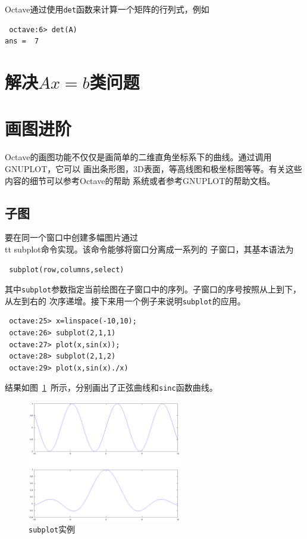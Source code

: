 \documentclass[UTF8,adobefonts]{ctexart}
\begin{document}
Octave通过使用{\tt det}函数来计算一个矩阵的行列式，例如
\begin{verbatim}
 octave:6> det(A)
ans =  7
\end{verbatim}
\section{解决$Ax=b$类问题}

\section{画图进阶}
Octave的画图功能不仅仅是画简单的二维直角坐标系下的曲线。通过调用GNUPLOT，它可以
画出条形图，3D表面，等高线图和极坐标图等等。有关这些内容的细节可以参考Octave的帮助
系统或者参考GNUPLOT的帮助文档。
\subsection{子图}
要在同一个窗口中创建多幅图片通过{\\tt subplot}命令实现。该命令能够将窗口分离成一系列的
子窗口，其基本语法为
\begin{verbatim}
 subplot(row,columns,select)
\end{verbatim}
其中{\tt subplot}参数指定当前绘图在子窗口中的序列。子窗口的序号按照从上到下，从左到右的
次序递增。接下来用一个例子来说明{\tt subplot}的应用。
\begin{verbatim}
 octave:25> x=linspace(-10,10);
 octave:26> subplot(2,1,1)
 octave:27> plot(x,sin(x));
 octave:28> subplot(2,1,2)
 octave:29> plot(x,sin(x)./x)
\end{verbatim}
结果如图~\ref{sinandsinc}~所示，分别画出了正弦曲线和{\tt sinc}函数曲线。
\begin{figure}
 \centering
 \includegraphics[width=0.6\textwidth]{sinandsinc.eps}
 \caption{{\tt subplot}实例}
 \label{sinandsinc}
\end{figure}
\end{document}
